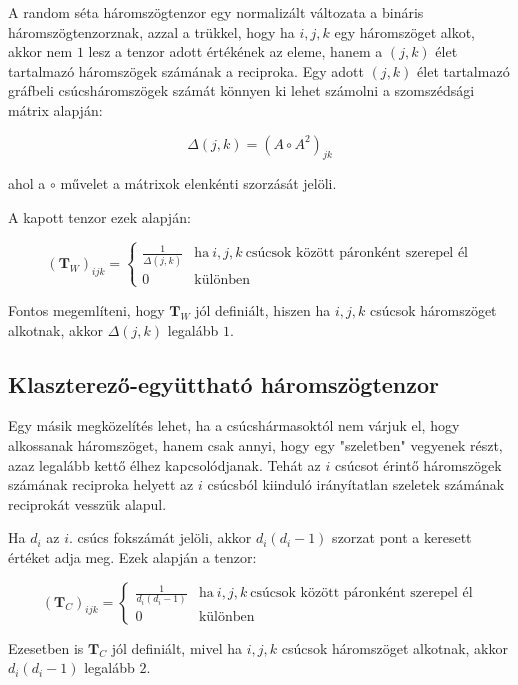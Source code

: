 \documentclass[12pt,numbers=noenddot]{report}
\begin{document}
A random séta háromszögtenzor egy normalizált változata a bináris 
háromszögtenzorznak, azzal a trükkel, hogy ha $i, j, k$ egy háromszöget alkot,
akkor nem $1$ lesz a tenzor adott értékének az eleme, hanem a $(j,k)$ élet
tartalmazó háromszögek számának a reciproka.
Egy adott $(j,k)$ élet tartalmazó gráfbeli csúcsháromszögek számát könnyen ki 
lehet számolni a szomszédsági mátrix alapján:

$$\Delta(j,k) = (A \circ A^2)_{jk}$$

\noindent
ahol a $\circ$ művelet a mátrixok elenkénti szorzását jelöli.

A kapott tenzor ezek alapján:

\begin{equation}
	(\boldsymbol{T}_W)_{ijk} = 
		\begin{cases}
			\frac{1}{\Delta(j,k)} & \text{ha} ~ i, j, k ~ \text{csúcsok között páronként szerepel él} \\
			0 & \text{különben}
		\end{cases}
\end{equation}

Fontos megemlíteni, hogy $\boldsymbol{T}_W$ jól definiált, hiszen ha 
$i, j, k$ csúcsok háromszöget alkotnak, akkor $\Delta(j,k)$ legalább $1$.


\subsection*{Klaszterező-együttható háromszögtenzor}

Egy másik megközelítés lehet, ha a csúcshármasoktól nem várjuk el, hogy 
alkossanak háromszöget, hanem csak annyi, hogy egy "szeletben" vegyenek részt,
azaz legalább kettő élhez kapcsolódjanak.
Tehát az $i$ csúcsot érintő háromszögek számának reciproka helyett az $i$ 
csúcsból kiinduló irányítatlan szeletek számának reciprokát vesszük alapul.

Ha $d_i$ az $i.$ csúcs fokszámát jelöli, akkor $d_i(d_i-1)$ szorzat pont a 
keresett értéket adja meg. Ezek alapján a tenzor:

\begin{equation}
	(\boldsymbol{T}_C)_{ijk} = 
		\begin{cases}
			\frac{1}{d_i(d_i-1)} & \text{ha} ~ i, j, k ~ \text{csúcsok között páronként szerepel él} \\
			0 & \text{különben}
		\end{cases}
\end{equation}

Ezesetben is $\boldsymbol{T}_C$ jól definiált, mivel ha 
$i, j, k$ csúcsok háromszöget alkotnak, akkor $d_i(d_i-1)$ legalább $2$.
\end{document}
